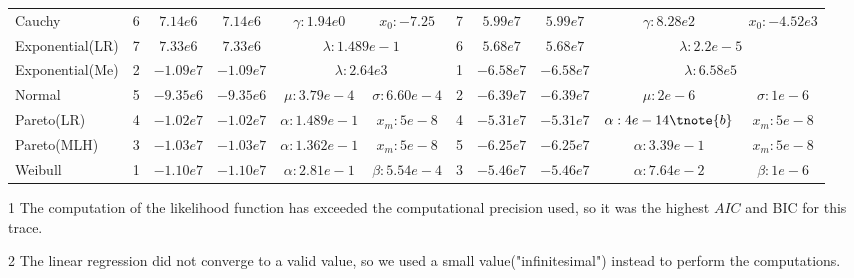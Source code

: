 \begin{table}
\begin{threeparttable}[t]
\begin{tabular}{lcccccccccc}
            Cauchy          &    6 & $7.14e6$    & $7.14e6$   & $\gamma:1.94e0$ &$x_0:-7.25$    
            &    7 & $5.99e7$    & $5.99e7$   & $ \gamma:8.28e2$ &$x_0:-4.52e3$    \\
            Exponential(LR) &    7 & $7.33e6$    & $7.33e6$   & \multicolumn{2}{c}{$\lambda:1.489e-1$}   
            &    6 & $5.68e7$    & $ 5.68e7$  & \multicolumn{2}{c}{$\lambda:2.2e-5$}   \\
            Exponential(Me) &    2 & $-1.09e7$   & $-1.09e7$  & \multicolumn{2}{c}{$\lambda:2.64e3$}   
            &    1 & $-6.58e7$   & $-6.58e7$  & \multicolumn{2}{c}{$\lambda:6.58e5$} \\
            Normal          &    5 & $-9.35e6$   & $-9.35e6$  & $\mu:3.79e-4$   &$\sigma:6.60e-4$ 
            &    2 & $-6.39e7$   & $-6.39e7$  & $\mu:2e-6$     & $\sigma:1e-6$ \\
            Pareto(LR)      &    4 & $-1.02e7$   & $-1.02e7$  & $\alpha:1.489e-1 $ & $x_m:5e-8 $    
            &    4 & $-5.31e7$   & $-5.31e7$  & $\alpha:4e-14\tnote{b}$ & $x_m:5e-8 $    \\
            Pareto(MLH)     &    3 & $-1.03e7$   & $-1.03e7$  & $\alpha:1.362e-1$ & $x_m:5e-8 $    
            &    5 & $-6.25e7$   & $-6.25e7$  & $\alpha:3.39e-1$ & $x_m:5e-8 $    \\
            Weibull         &    1 & $-1.10e7$   & $-1.10e7$  & $\alpha:2.81e-1$ & $\beta:5.54e-4$  
            &    3 & $-5.46e7$   & $-5.46e7$  & $\alpha:7.64e-2$ & $\beta:1e-6$  \\ \hline
        \end{tabular}
            \begin{tablenotes}
            \item[1] The computation of the likelihood function has exceeded the computational precision used, so it was the highest $AIC$ and BIC  for this trace.
            \item[2] The linear regression did not converge to a valid value, so we used a small value("infinitesimal") instead to perform the computations.
            \end{tablenotes}
        \end{threeparttable}
    \label{tab:prototype-results}
\end{table}

